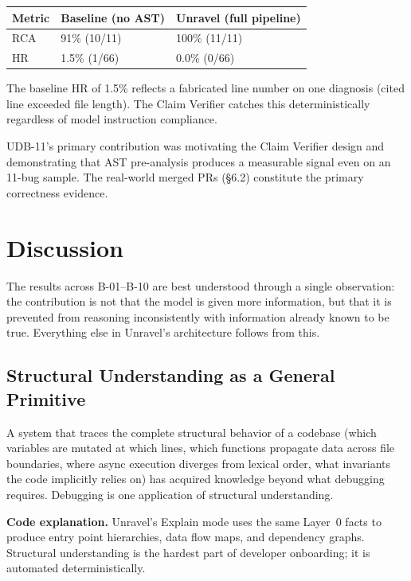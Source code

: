 \documentclass[12pt,a4paper]{article}
\begin{document}
\vspace{4pt}
\begin{center}
\begin{tabular}{@{}l p{4.2cm} p{4.2cm}@{}}
\toprule
\textbf{Metric} & \textbf{Baseline (no AST)} & \textbf{Unravel (full pipeline)} \\
\midrule
RCA  & 91\% (10/11) & 100\% (11/11) \\
HR   & 1.5\% (1/66) & \phantom{0}0.0\% (0/66) \\
\bottomrule
\end{tabular}
\end{center}

\vspace{4pt}
The baseline HR of 1.5\% reflects a fabricated line number on one diagnosis (cited line
exceeded file length). The Claim Verifier catches this deterministically regardless of
model instruction compliance.

UDB-11's primary contribution was motivating the Claim Verifier design and demonstrating
that AST pre-analysis produces a measurable signal even on an 11-bug sample. The
real-world merged PRs (\S6.2) constitute the primary correctness evidence.

\section{Discussion}

The results across B-01--B-10 are best understood through a single observation:
the contribution is not that the model is given more information, but that it is
prevented from reasoning inconsistently with information already known to be true.
Everything else in Unravel's architecture follows from this.

\subsection{Structural Understanding as a General Primitive}

A system that traces the complete structural behavior of a codebase (which variables are
mutated at which lines, which functions propagate data across file boundaries, where async
execution diverges from lexical order, what invariants the code implicitly relies on) has
acquired knowledge beyond what debugging requires. Debugging is one application of
structural understanding.

\textbf{Code explanation.} Unravel's Explain mode uses the same Layer~0 facts to produce
entry point hierarchies, data flow maps, and dependency graphs. Structural understanding
is the hardest part of developer onboarding; it is automated deterministically.
\end{document}
